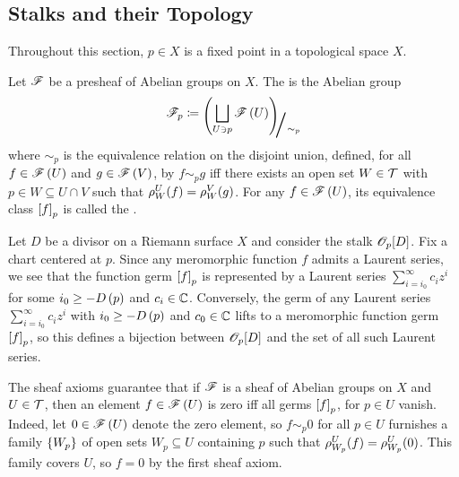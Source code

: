 \documentclass[../Moduli_Spaces_of_Riemann_Surfaces.tex]{subfiles}
\begin{document}
    \subsection{Stalks and their Topology}
    Throughout this section, $p\in X$ is a fixed point in a topological space $X$.
    \begin{definition}
        Let $\mathscr{F}$ be a presheaf of Abelian groups on $X$. The  is the Abelian group
        \begin{equation*}
            \ms{F}_p\coloneqq\raisebox{-2pt}{$\Biggl(\!$}\bigsqcup_{U\ni p}\ms{F}\l(U\r)\!\raisebox{-2pt}{$\Biggr)$}\!\!_{\scalebox{2}{/}\sim_p}
        \end{equation*}
        where $\sim_p$ is the equivalence relation on the disjoint union, defined, for all $f\in\mathscr{F}\left(U\right)$ and $g\in\mathscr{F}\left(V\right)$, by $f\sim_p g$ iff there exists an open set $W\in\mathcal{T}$ with $p\in W\subseteq U\cap V$ such that $\rho^U_W\!\left(f\right)=\rho^V_W\!\left(g\right)$. For any $f\in\mathscr{F}\left(U\right)$, its equivalence class $\left[f\right]_p$ is called the .
    \end{definition}
    \begin{example}
        Let $D$ be a divisor on a Riemann surface $X$ and consider the stalk $\mathscr{O}_p\!\left[D\right]$. Fix a chart centered at $p$. Since any meromorphic function $f$ admits a Laurent series, we see that the function germ $\left[f\right]_p$ is represented by a Laurent series $\sum_{i=i_0}^{\infty}c_iz^i$ for some $i_0\geq-D\left(p\right)$ and $c_i\in\mathbb{C}$. Conversely, the germ of any Laurent series $\sum_{i=i_0}^{\infty}c_iz^i$ with $i_0\geq-D\left(p\right)$ and $c_0\in\mathbb{C}$ lifts to a meromorphic function germ $\left[f\right]_p$, so this defines a bijection between $\mathscr{O}_p\!\left[D\right]$ and the set of all such Laurent series.\exqed
    \end{example}
    \begin{remark}
        The sheaf axioms guarantee that if $\mathscr{F}$ is a sheaf of Abelian groups on $X$ and $U\in\mathcal{T}$, then an element $f\in\mathscr{F}\left(U\right)$ is zero iff all germs $\left[f\right]_p$, for $p\in U$ vanish. Indeed, let $0\in\mathscr{F}\left(U\right)$ denote the zero element, so $f\sim_p0$ for all $p\in U$ furnishes a family $\left\{W_p\right\}$ of open sets $W_p\subseteq U$ containing $p$ such that $\rho^U_{W_p}\!\left(f\right)=\rho^U_{W_p}\!\left(0\right)$. This family covers $U$, so $f=0$ by the first sheaf axiom.\exqed
    \end{remark}
\end{document}
